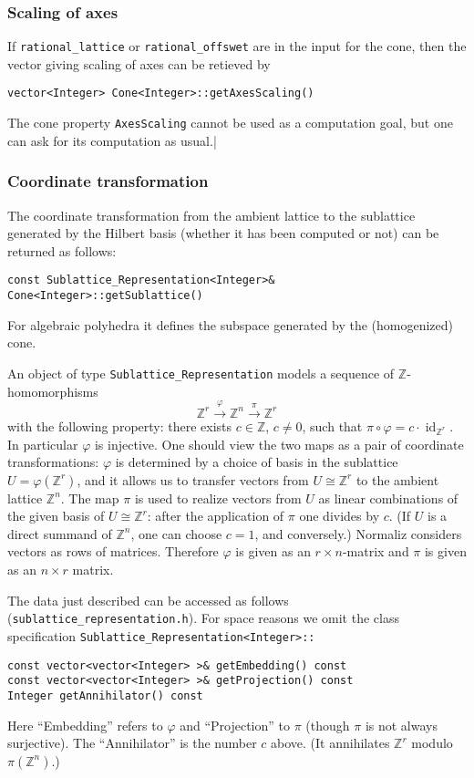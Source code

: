\documentclass[12pt,a4paper]{scrartcl}
\theoremstyle{definition}
\let\phi=\varphi
\def\ZZ{{\mathbb Z}}
\begin{document}
\begin{small}
\subsubsection{Scaling of axes}

If \verb|rational_lattice| or \verb|rational_offswet| are in the input for the cone, then the vector giving scaling of axes can be retieved by
\begin{Verbatim}
vector<Integer> Cone<Integer>::getAxesScaling() 
\end{Verbatim}
The cone property \verb|AxesScaling| cannot be used as a computation goal, but one can ask for its computation as usual.|

\subsubsection{Coordinate transformation}\label{coord}

The coordinate transformation from the ambient lattice to the sublattice generated by the Hilbert basis (whether it has been computed or not) can be returned as follows:
\begin{Verbatim}
const Sublattice_Representation<Integer>& Cone<Integer>::getSublattice()
\end{Verbatim}
For algebraic polyhedra it defines the subspace generated by the (homogenized) cone.

An object of type \verb|Sublattice_Representation| models a sequence of $\ZZ$-homomorphisms
$$
\ZZ^r\xrightarrow{\phi}\ZZ^n\xrightarrow{\pi}\ZZ^r
$$
with the following property: there exists $c\in\ZZ$, $c\neq 0$, such that $\pi\circ \phi=c\cdot\operatorname{id}_{\ZZ^r}$. In particular $\phi$ is injective. One should view the two maps as a pair of coordinate transformations: $\phi$ is determined by a choice of basis in the sublattice $U=\phi(\ZZ^r)$, and it allows us to transfer vectors from $U\cong \ZZ^r$ to the ambient lattice $\ZZ^n$. The map $\pi$ is used to realize vectors from $U$ as linear combinations of the given basis of $U\cong\ZZ^r$: after the application of $\pi$ one divides by $c$. (If $U$ is a direct summand of $\ZZ^n$, one can choose $c=1$, and conversely.) Normaliz considers vectors as rows of matrices. Therefore $\phi$ is given as an $r\times n$-matrix and $\pi$ is given as an $n\times r$ matrix.

The data just described can be accessed as follows (\verb|sublattice_representation.h|). For space reasons we omit the class specification \verb|Sublattice_Representation<Integer>::|
\begin{Verbatim}
const vector<vector<Integer> >& getEmbedding() const
const vector<vector<Integer> >& getProjection() const
Integer getAnnihilator() const
\end{Verbatim}
Here ``Embedding'' refers to $\phi$ and ``Projection'' to $\pi$ (though $\pi$ is not always surjective). The ``Annihilator'' is the number $c$ above. (It annihilates $\ZZ^r$ modulo $\pi(\ZZ^n)$.)


\end{small}
\end{document}

